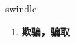 
\begin{frame}
{\huge swindle}
\begin{center}
\begin{enumerate}\Large
  \item \textbf{欺骗，骗取}
\end{enumerate}
\end{center}
\end{frame}
